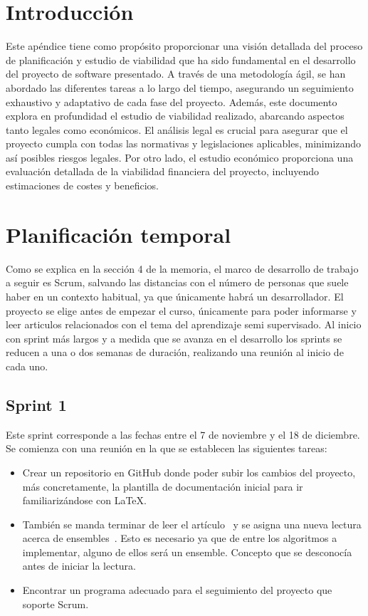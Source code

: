 
\section{Introducción}
Este apéndice tiene como propósito proporcionar una visión detallada del proceso de planificación y estudio de viabilidad que ha sido fundamental en el desarrollo del proyecto de software presentado. A través de una metodología ágil, se han abordado las diferentes tareas a lo largo del tiempo, asegurando un seguimiento exhaustivo y adaptativo de cada fase del proyecto.
Además, este documento explora en profundidad el estudio de viabilidad realizado, abarcando aspectos tanto legales como económicos. El análisis legal es crucial para asegurar que el proyecto cumpla con todas las normativas y legislaciones aplicables, minimizando así posibles riesgos legales. Por otro lado, el estudio económico proporciona una evaluación detallada de la viabilidad financiera del proyecto, incluyendo estimaciones de costes y beneficios.

\section{Planificación temporal}
Como se explica en la sección 4 de la memoria, el marco de desarrollo de trabajo a seguir es Scrum, salvando las distancias con el número de personas que suele haber en un contexto habitual, ya que únicamente habrá un desarrollador.
El proyecto se elige antes de empezar el curso, únicamente para poder informarse y leer articulos relacionados con el tema del aprendizaje semi supervisado. Al inicio con sprint más largos y a medida que se avanza en el desarrollo los sprints se reducen a una o dos semanas de duración, realizando una reunión al inicio de cada uno.


\subsection{Sprint 1}
Este sprint corresponde a las fechas entre el 7 de noviembre y el 18 de diciembre. Se comienza con una reunión en la que se establecen las siguientes tareas:\\
\begin{itemize}
	\item Crear un repositorio en GitHub donde poder subir los cambios del proyecto, más concretamente, la plantilla de documentación inicial para ir familiarizándose con \LaTeX.
	\item También se manda terminar de leer el artículo~\cite{Engelen:semi-supervised} y se asigna una nueva lectura acerca de ensembles~\cite{ensembles}. Esto es necesario ya que de entre los algoritmos a implementar, alguno de ellos será un ensemble. Concepto que se desconocía antes de iniciar la lectura.
	\item Encontrar un programa adecuado para el seguimiento del proyecto que soporte Scrum.
\end{itemize}

